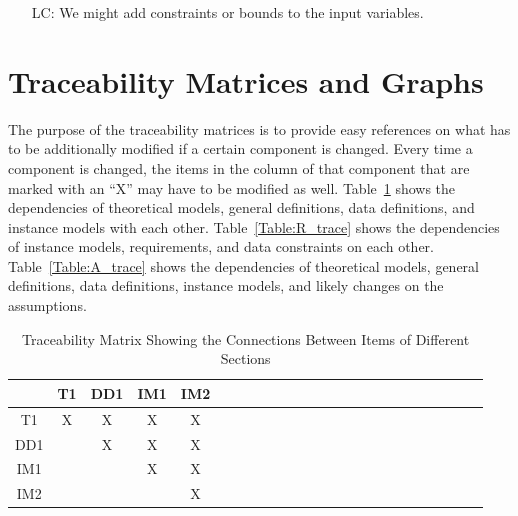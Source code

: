 \documentclass[12pt]{article}
\newcounter{lcnum} %
\begin{document}
\noindent \begin{itemize}

\item[LC\refstepcounter{lcnum}\thelcnum\label{LC_meaningfulLabel}:] We might 
add constraints or bounds to the input variables. 

\end{itemize}

\section{Traceability Matrices and Graphs}

The purpose of the traceability matrices is to provide easy references on what
has to be additionally modified if a certain component is changed.  Every time a
component is changed, the items in the column of that component that are marked
with an ``X'' may have to be modified as well.  Table~\ref{Table:B_trace} shows 
the
dependencies of theoretical models, general definitions, data definitions, and
instance models with each other. Table~\ref{Table:R_trace} shows the
dependencies of instance models, requirements, and data constraints on each
other. Table~\ref{Table:A_trace} shows the dependencies of theoretical models,
general definitions, data definitions, instance models, and likely changes on
the assumptions.\\


\begin{table}[h!]
\centering
\begin{tabular}{|c|c|c|c|c|c|c|c|c|c|c|c|c|c|c|c|c|c|c|c|c|c|c|c|}
\hline        
	& T1& DD1& IM1 & IM2 \\
\hline
T1     &X &X &X &X   \\ \hline
DD1    & &X &X &X  \\ \hline
IM1    & & &X &X  \\ \hline 
IM2    & & & &X    \\ 
\hline
\end{tabular}\\
\caption{Traceability Matrix Showing the Connections Between Items of 
Different 
Sections}
\label{Table:B_trace}
\end{table}
\end{document}

